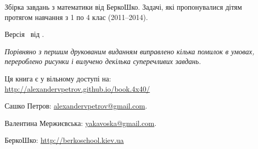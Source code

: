 
{
\fontsize{\OPTinfopagefontsize}{2.0\OPTinfopagefontsize}\selectfont

\noindent
Збірка завдань з математики від БеркоШко.
Задачі, які пропонувалися дітям протягом навчання з 1 по 4 клас (2011--2014).

\bigskip

\noindent
Версія \Version\ від \Date.

\bigskip

\noindent
\emph{Порівняно з першим друкованим виданням виправлено кілька помилок
в умовах, перероблено рисунки і вилучено декілька суперечливих завдань.}

\bigskip

\noindent
Ця книга є у вільному доступі на:\\
\url{http://alexandervpetrov.github.io/book.4x40/}

\bigskip

\noindent
Сашко Петров: \href{mailto:alexandervpetrov@gmail.com}{alexandervpetrov@gmail.com}.

\noindent
Валентина Мержиєвська: \href{mailto:yakavoska@gmail.com}{yakavoska@gmail.com}.

\bigskip

\noindent
БеркоШко: \url{http://berkoschool.kiev.ua}
}

\clearpage
